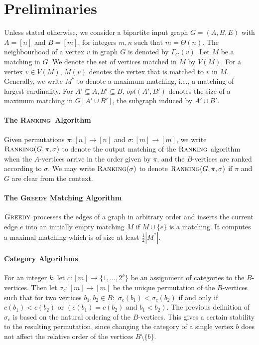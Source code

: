 \documentclass[a4paper]{article}
\newcommand{\Rank}{\textsc{Ranking}}
\newcommand{\Greedy}{\textsc{Greedy}}
\begin{document}
\section{Preliminaries}\label{sec:prelim}
Unless stated otherwise, we consider a bipartite input graph $G=(A, B, E)$ with $A = [n]$ and
$B = [m]$, for integers $m,n$ such that $m = \Theta(n)$.
The neighbourhood of a vertex $v$ in graph $G$ is denoted by $\Gamma_G(v)$.
Let $M$ be a matching in $G$. We denote the set of vertices matched in $M$ by $V(M)$. For a vertex $v \in V(M)$,
$M(v)$ denotes the vertex that is matched to $v$ in $M$. Generally, we write $M^*$ to denote a maximum
matching, i.e., a matching of largest cardinality. For $A' \subseteq A, B' \subseteq B$,
$opt(A', B')$ denotes the size of a maximum matching in $G[A' \cup B']$, the subgraph induced by $A' \cup B'$.

\paragraph*{The \Rank~Algorithm}
Given permutations $\pi: [n] \rightarrow [n]$
and $\sigma: [m] \rightarrow [m]$, we write $\Rank(G, \pi, \sigma)$ to denote the output matching of the
$\Rank$ algorithm when the $A$-vertices arrive in the order given by $\pi$, and the $B$-vertices are ranked
according to $\sigma$. We may write $\Rank(\sigma)$ to denote $\Rank(G, \pi, \sigma)$ if $\pi$ and $G$
are clear from the context.

\paragraph*{The \textsc{Greedy} Matching Algorithm} $\Greedy$ processes the edges
of a graph in arbitrary order and inserts the current edge $e$ into an initially empty matching $M$ if
$M \cup \{e\}$ is a matching. It computes a maximal matching which is of size at least $\frac{1}{2} |M^*|$.


\paragraph*{Category Algorithms} For an integer $k$, let $c: [m] \rightarrow \{1, \dots, 2^k\}$ be an assignment
of categories to the $B$-vertices. Then let $\sigma_c: [m] \rightarrow [m]$ be the unique permutation of the
$B$-vertices such that for two vertices $b_1, b_2 \in B: $ $\sigma_c(b_1) < \sigma_c(b_2)$ if
and only if $c(b_1) < c(b_2)$ or $(c(b_1) = c(b_2) \mbox{ and } b_1 < b_2)$. The previous definition of $\sigma_c$
is based on the natural ordering of the $B$-vertices. This gives a certain stability to the resulting permutation,
since changing the category of a single vertex $b$ does not affect the relative order of the vertices
$B \setminus \{b \}$.
\end{document}
